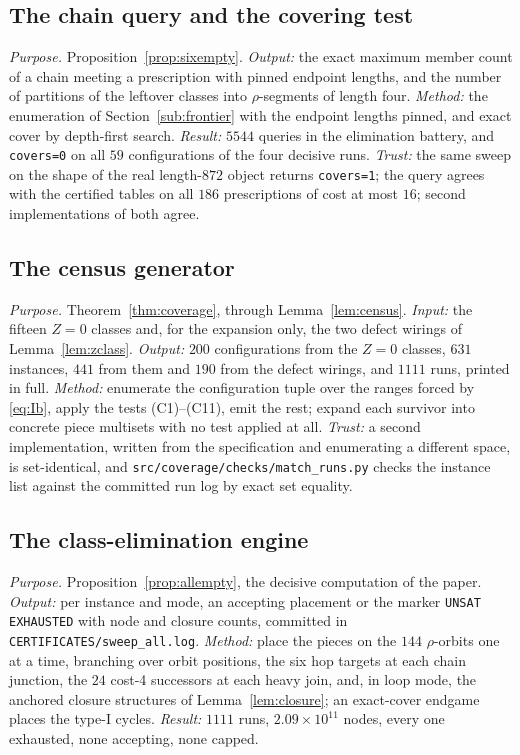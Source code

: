 \documentclass[10pt]{article}
\theoremstyle{remark}
\theoremstyle{plain}
\newcommand{\prog}[1]{\texttt{#1}}
\begin{document}
\subsection{The chain query and the covering test}\label{sub:chainq}

\emph{Purpose.}  Proposition~\ref{prop:sixempty}.  \emph{Output:} the
exact maximum member count of a chain meeting a prescription with
pinned endpoint lengths, and the number of partitions of the leftover
classes into $\rho$-segments of length four.
\emph{Method:} the enumeration of Section~\ref{sub:frontier} with the
endpoint lengths pinned, and exact cover by depth-first search.
\emph{Result:} $5544$ queries in the elimination battery, and
\prog{covers=0} on all $59$ configurations of the four decisive runs.
\emph{Trust:} the same sweep on the shape of the real length-$872$
object returns \prog{covers=1}; the query agrees with the certified
tables on all $186$ prescriptions of cost at most $16$; second
implementations of both agree.

\subsection{The census generator}\label{sub:census}

\emph{Purpose.}  Theorem~\ref{thm:coverage}, through
Lemma~\ref{lem:census}.
\emph{Input:} the fifteen $Z=0$ classes and, for the expansion only,
the two defect wirings of Lemma~\ref{lem:zclass}.  \emph{Output:} $200$
configurations from the $Z=0$ classes, $631$ instances, $441$ from
them and $190$ from the defect wirings, and $1111$ runs, printed in
full.  \emph{Method:} enumerate the configuration tuple over the ranges
forced by \eqref{eq:Ib}, apply the tests (C1)--(C11), emit the
rest; expand each survivor into concrete piece multisets with no test
applied at all.  \emph{Trust:} a second implementation, written from the specification
and enumerating a different space, is set-identical, and
\prog{src/\allowbreak coverage/\allowbreak checks/\allowbreak match\_runs.py}
checks the instance list against the committed run log by exact set
equality.

\subsection{The class-elimination engine}\label{sub:engine}

\emph{Purpose.}  Proposition~\ref{prop:allempty}, the decisive
computation of the paper.  \emph{Output:} per instance and mode, an
accepting placement or the marker \prog{UNSAT EXHAUSTED} with node and
closure counts, committed in
\prog{CERTIFICATES/\allowbreak sweep\_all.log}.  \emph{Method:} place the pieces on the $144$ $\rho$-orbits one at a
time, branching over orbit positions, the six hop targets at each
chain junction, the $24$ cost-4 successors at each heavy join, and, in
loop mode, the anchored closure structures of Lemma~\ref{lem:closure};
an exact-cover endgame places the type-I cycles.  \emph{Result:} $1111$
runs, $2.09\times10^{11}$ nodes, every one exhausted, none accepting,
none capped.
\end{document}

